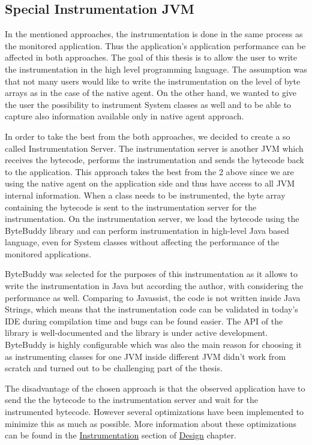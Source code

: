 \subsection{Special Instrumentation JVM}
In the mentioned approaches, the instrumentation is done in the same process as the monitored application. Thus the application's application performance can be affected in both approaches. The goal of this thesis is to allow the user to write the instrumentation in the high level programming language. The assumption was that not many users would like to write the instrumentation on the level of byte arrays as in the case of the native agent. On the other hand, we wanted to give the user the possibility to instrument System classes as well and to be able to capture also information available only in native agent approach.

In order to take the best from the both approaches, we decided to create a so called Instrumentation Server. The instrumentation server is another JVM which receives the bytecode, performs the instrumentation and sends the bytecode back to the application.
This approach takes the best from the 2 above since we are using the native agent on the application side and thus have access to all JVM internal information. When a class needs to be instrumented,  the byte array containing the bytecode is sent to the instrumentation server for the instrumentation. On the instrumentation server, we load the bytecode using the ByteBuddy library and can perform instrumentation in high-level Java based language, even for System classes without affecting the performance of the monitored applications.

ByteBuddy was selected for the purposes of this instrumentation as it allows to write the instrumentation in Java but according the author, with considering the performance as well. Comparing to Javassist, the code is not written inside Java Strings, which means that the instrumentation code can be validated in today's IDE during compilation time and bugs can be found easier. The API of the library is well-documented and the library is under active development. ByteBuddy is highly configurable which was also the main reason for choosing it as instrumenting classes for one JVM inside different JVM didn't work from scratch and turned out to be challenging part of the thesis.

The disadvantage of the chosen approach is that the observed application have to send the the bytecode to the instrumentation server and wait for the instrumented bytecode. However several optimizations have been implemented to minimize this as much as possible. More information about these optimizations can be found in the \hyperref[sec:inst_server]{Instrumentation} section of \hyperref[chap:design]{Design} chapter.

